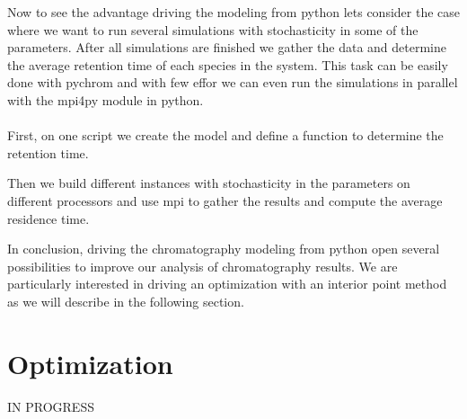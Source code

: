\documentclass[paper=a4, fontsize=11pt]{scrartcl}
\begin{document}
Now to see the advantage driving the modeling from python lets consider the case where we want to run several simulations with stochasticity in some of the parameters. After all simulations are finished we gather the data and determine the average retention time of each species in the system. This task can be easily done with pychrom and with few effor we can even run the simulations in parallel with the mpi4py module in python. 
\\
\\
First, on one script we create the model and define a function to determine the retention time.



Then we build different instances with stochasticity in the parameters on different processors and use mpi to gather the results and compute the average residence time.



In conclusion, driving the chromatography modeling from python open several possibilities to improve our analysis of chromatography results. We are particularly interested in driving an optimization with an interior point method as we will describe in the following section.

\section{Optimization}
IN PROGRESS
\end{document}
